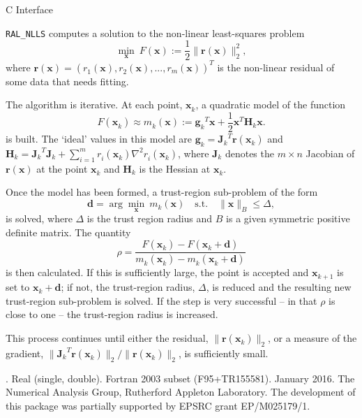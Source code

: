 \documentclass{spec}
\newcommand{\libraryname}{RAL}
\newcommand{\packagename}{NLLS}
\newcommand{\fullpackagename}{\libraryname\_\packagename}
\newcommand{\versionum}{0.5.0}
\newcommand{\versiondate}{15 January 2016}
\newcommand{\vx}{ {\bm x} } %
\newcommand{\vr}{ {\bm r} } %
\newcommand{\vg}{ {\bm g} } %
\newcommand{\vd}{ {\bm d} } %
\newcommand{\vH}{ {\bm H} } %
\newcommand{\vJ}{ {\bm J} } %
\newcommand{\iter}[2][k]{ #2_{#1}^{}} %
\newcommand{\comp}[2][i]{ #2_{#1}^{}} %
\begin{document}
\hslheader

\begin{center}
\huge \sc  C Interface
\end{center}

\hslsummary
{\tt \fullpackagename} computes a solution to the non-linear least-squares problem
\begin{equation}
\min_\vx \  F(\vx) := \frac{1}{2}\| \vr(\vx) \|_2^2,
\label{eq:nlls_problem}
\end{equation}
where $\vr(\vx) =(\comp[1]{r}(\vx), \comp[2]{r}(\vx),...,\comp[m]{r}(\vx))^T$ is the non-linear residual of 
some data that needs fitting.

The algorithm is iterative.
At each point, $\iter{\vx}$, a quadratic model of the function
\[
F(\iter{\vx}) \approx \iter{m}(\vx) := {\iter{\vg}}^T \vx + \frac{1}{2} {\vx}^T \iter{\vH} \vx.
\]
is built.
The `ideal' values in this model are $\iter{\vg} = {\iter{\vJ}}^T\vr(\iter{\vx})$ and 
$\iter{\vH} = {\iter{\vJ}}^T\iter{\vJ} + \sum_{i = 1}^m \comp{r}(\iter{\vx}) \nabla^2 \comp{r}(\iter{\vx})$, 
where $\iter{\vJ}$ denotes the $m \times n$ Jacobian of $\vr(\vx)$ at the point $\iter{\vx}$
and $\iter{\vH}$ is the Hessian at $\iter{\vx}$.

Once the model has been formed, a trust-region sub-problem of the form
\[
\vd = \arg \min_{\vx} \ \iter{m} (\vx) \quad \mathrm{s.t.} \quad  \|\vx\|_B \leq \Delta,
\]
is solved, 
where $\Delta$ is the trust region radius and $B$ is a given symmetric positive definite matrix. 
The quantity
\[\rho = \frac{F(\iter{\vx}) - F(\iter{\vx} + \vd)}{\iter{m}(\iter{\vx}) - \iter{m}(\iter{\vx} + \vd)}\]
is then calculated.
If this is sufficiently large, the point is accepted and  $\iter[k+1]{\vx}$ is set to $\iter{\vx} + \vd$; if not, the trust-region radius, $\Delta$, 
is reduced and  the resulting new trust-region sub-problem is solved.  If the step is very successful -- in that $\rho$ is close to one -- 
the trust-region radius is increased.

This process continues until either the residual, $\|\vr(\iter{\vx})\|_2$, or a measure of the gradient,
$\|{\iter{\vJ}}^T\vr(\iter{\vx})\|_2 / \|\vr(\iter{\vx})\|_2$, is sufficiently small.


\hslattributes
\hslversions{\versionum\ (\versiondate)}.
\hslIRDCZ Real (single, double).
\hsllanguage Fortran 2003 subset (F95+TR155581).  
\hsldate January 2016. 
\hslorigin The Numerical Analysis Group, Rutherford Appleton Laboratory.
\hslremark The development of this package was 
partially supported by EPSRC grant EP/M025179/1.
\end{document}
